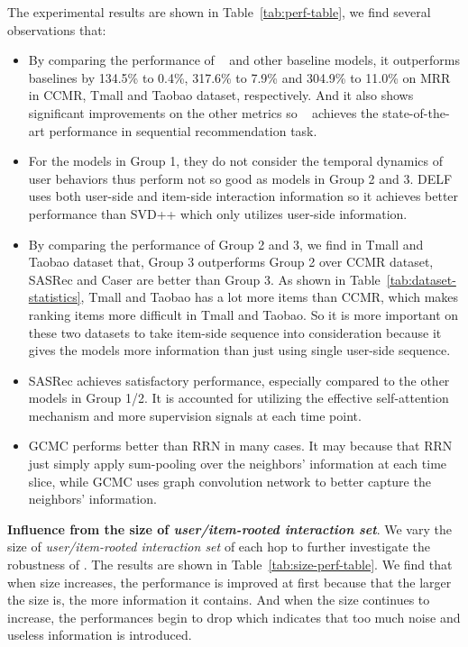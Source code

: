 The experimental results are shown in Table~\ref{tab:perf-table}, we find several observations that:
\begin{itemize}[leftmargin=15pt]
	\item By comparing the performance of \score~ and other baseline models, it outperforms baselines by 134.5\% to 0.4\%, 317.6\% to 7.9\% and 304.9\% to 11.0\% on MRR in CCMR, Tmall and Taobao dataset, respectively. And it also shows significant improvements on the other metrics so \score~ achieves the state-of-the-art performance in sequential recommendation task.
	\item For the models in Group 1, they do not consider the temporal dynamics of user behaviors thus perform not so good as models in Group 2 and 3. DELF uses both user-side and item-side interaction information so it achieves better performance than SVD++ which only utilizes user-side information.
	\item By comparing the performance of Group 2 and 3, we find in Tmall and Taobao dataset that, Group 3 outperforms Group 2 over CCMR dataset, SASRec and Caser are better than Group 3. As shown in Table~\ref{tab:dataset-statistics}, Tmall and Taobao has a lot more items than CCMR, which makes ranking items more difficult in Tmall and Taobao. So it is more important on these two datasets to take item-side sequence into consideration because it gives the models more information than just using single user-side sequence. 
	\item SASRec achieves satisfactory performance, especially compared to the other models in Group 1/2. It is accounted for utilizing the effective self-attention mechanism and more supervision signals at each time point.
	\item GCMC performs better than RRN in many cases. It may because that RRN just simply apply sum-pooling over the neighbors' information at each time slice, while GCMC uses graph convolution network to better capture the neighbors' information.
\end{itemize}

\textbf{Influence from the size of \textit{user/item-rooted interaction set}}.
We vary the size of \textit{user/item-rooted interaction set} of each hop to further investigate the robustness of \score. The results are shown in Table~\ref{tab:size-perf-table}. 
We find that when size increases, the performance is improved at first because that the larger the size is, the more information it contains. And when the size continues to increase, the performances begin to drop which indicates that too much noise and useless information is introduced.

